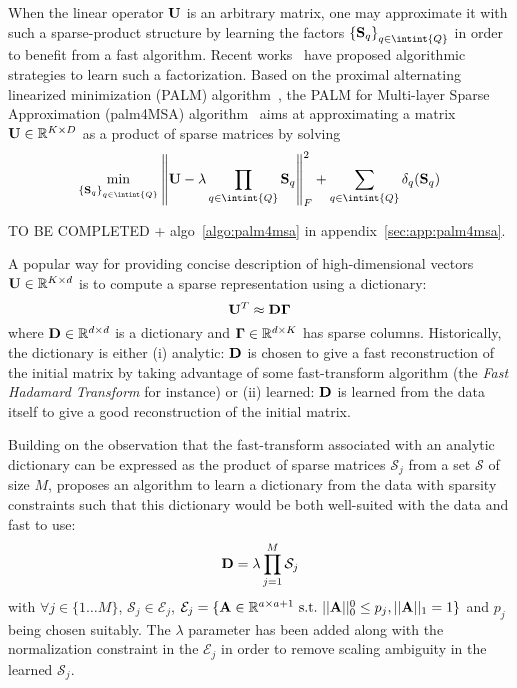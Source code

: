 When the linear operator ${\mathbf{U}}$ is an arbitrary matrix, one may approximate it with such a sparse-product structure by learning the factors $\left \lbrace\rmS_q\right \rbrace_{q\in\intint{Q}}$ in order to benefit from a fast algorithm.
Recent works~\cite{LeMagoarou2016Flexible} have proposed algorithmic strategies to learn such a factorization. Based on the proximal alternating linearized minimization (PALM) algorithm~\cite{bolte2014proximal}, the PALM for Multi-layer Sparse Approximation (palm4MSA) algorithm~\cite{LeMagoarou2016Flexible} aims at approximating a matrix ${\mathbf{U}}\in{\mathbb{R}}^{K\times D}$ as a product of sparse matrices by solving
\begin{align}
\label{eq:palm4msa}
\min_{\left \lbrace\rmS_q\right \rbrace_{q\in\intint{Q}}} \left \|\rmU - \lambda \prod_{q\in\intint{\nfactors}}{\rmS_q}\right \|_F^2 + \sum_{q\in\intint{\nfactors}} \delta_q(\rmS_q)
\end{align}


TO BE COMPLETED + algo~\ref{algo:palm4msa} in appendix~\ref{sec:app:palm4msa}.

A popular way for providing concise description of high-dimensional vectors ${\mathbf{U}} \in \mathbb{R}^{K \times d}$ is to compute a sparse representation using a dictionary:
%
\begin{equation}
{\mathbf{U}}^T \approx {\mathbf{D}}{\mathbf{\Gamma}}
\end{equation}
%
where ${\mathbf{D}} \in \mathbb{R}^{d \times d}$ is a dictionary and ${\mathbf{\Gamma}} \in \mathbb{R}^{d \times K}$ has sparse columns. Historically, the dictionary is either (i) analytic: ${\mathbf{D}}$ is chosen to give a fast reconstruction of the initial matrix by taking advantage of some fast-transform algorithm (the \textit{Fast Hadamard Transform} for instance) or (ii) learned: ${\mathbf{D}}$ is learned from the data itself to give a good reconstruction of the initial matrix.

Building on the observation that the fast-transform associated with an analytic dictionary can be expressed as the product of sparse matrices $\mathcal{S}_j$ from a set $\mathcal{S}$ of size $M$, \cite{magoarou2014learning} proposes an algorithm to learn a dictionary from the data with sparsity constraints such that this dictionary would be both well-suited with the data and fast to use:
%
\begin{equation}
{\mathbf{D}} = \lambda \prod_{j=1}^{M}\mathcal{S}_j
\end{equation}
%
with $\forall j \in \{1 \ldots M\}$, $\mathcal{S}_j \in \mathcal{E}_j$, $\mathcal{E}_j = \lbrace {\mathbf{A}} \in \mathbb{R}^{a \times a+1}~\text{s.t.}~||{\mathbf{A}}||_0^0 \leq p_j, ||{\mathbf{A}}||_1 = 1 \rbrace$ and $p_j$ being chosen suitably. The $\lambda$ parameter has been added along with the normalization constraint in the $\mathcal{E}_j$ in order to remove scaling ambiguity in the learned $\mathcal{S}_j$.

